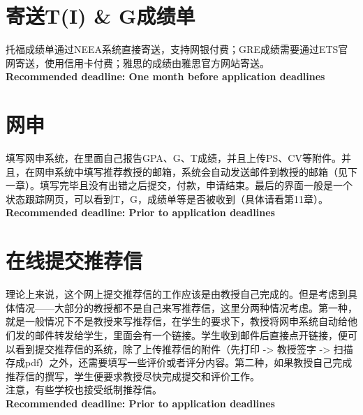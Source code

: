 \documentclass{article}
\begin{document}
\section{寄送T(I) \& G成绩单}
托福成绩单通过NEEA系统直接寄送，支持网银付费；GRE成绩需要通过ETS官网寄送，使用信用卡付费；雅思的成绩由雅思官方网站寄送。\\
\textbf{Recommended deadline: One month before application deadlines}


\section{网申}
填写网申系统，在里面自己报告GPA、G、T成绩，并且上传PS、CV等附件。并且，在网申系统中填写推荐教授的邮箱，系统会自动发送邮件到教授的邮箱（见下一章）。填写完毕且没有出错之后提交，付款，申请结束。最后的界面一般是一个状态跟踪网页，可以看到T，G，成绩单等是否被收到（具体请看第11章）。\\
\textbf{Recommended deadline: Prior to application deadlines}

\section{在线提交推荐信}
理论上来说，这个网上提交推荐信的工作应该是由教授自己完成的。但是考虑到具体情况——大部分的教授都不是自己来写推荐信，这里分两种情况考虑。第一种，就是一般情况下不是教授来写推荐信，在学生的要求下，教授将网申系统自动给他们发的邮件转发给学生，里面会有一个链接。学生收到邮件后直接点开链接，便可以看到提交推荐信的系统，除了上传推荐信的附件（先打印 -> 教授签字 -> 扫描存成pdf）之外，还需要填写一些评价或者评分内容。第二种，如果教授自己完成推荐信的撰写，学生便要求教授尽快完成提交和评价工作。\\
\indent 注意，有些学校也接受纸制推荐信。 \\  
\textbf{Recommended deadline: Prior to application deadlines}
\end{document}
